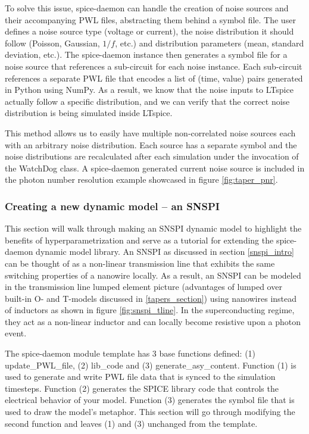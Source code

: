 \documentclass[]{article}
\newcommand{\todo}[2][]{}
\newcommand{\cf}[1]{\textsf{#1}}
\begin{document}
To solve this issue, spice-daemon can handle the creation of noise sources and their accompanying PWL files,
abstracting them behind a symbol file. The user defines a noise source type (voltage or current), the 
noise distribution it should follow (Poisson, Gaussian, $1/f$, etc.) and distribution parameters (mean, 
standard deviation, etc.). The spice-daemon instance then generates a symbol file for a noise source that 
references a sub-circuit for each noise instance. Each sub-circuit references a 
separate PWL file that encodes a list of (time, value) pairs generated in Python using
\cf{NumPy}. As a result, we know that the noise inputs to LTspice actually follow a specific distribution, and we
can verify that the correct noise distribution is being simulated inside LTspice.

This method  allows us to easily have multiple non-correlated noise sources each with an 
arbitrary noise  distribution. Each source has a separate symbol and the noise 
distributions are recalculated after each simulation under the invocation of the \cf{WatchDog}
class. A spice-daemon generated current noise source is included in the photon number resolution 
example showcased in figure \ref{fig:taper_pnr}.

\todo[]{noise example}

\subsubsection{Creating a new dynamic model -- an SNSPI}

This section will walk through making an SNSPI dynamic model to highlight the benefits
of hyperparametrization and serve as a tutorial for extending the spice-daemon dynamic model library. 
An SNSPI as discussed in section \ref{snspi_intro} can be thought
of as a non-linear transmission line that exhibits the same switching properties of a nanowire
locally. As a result, an SNSPI can be modeled in the transmission line lumped element picture
(advantages of lumped over built-in O- and T-models discussed in \ref{tapers_section})
using nanowires instead of inductors as shown in figure
\ref{fig:snspi_tline}. In the superconducting regime, they act as a non-linear
inductor and can locally become resistive upon a photon event.

\begin{sloppypar}
The spice-daemon module template has 3 base functions defined: (1) \cf{update\_PWL\_file},
(2) \cf{lib\_code} and (3) \cf{generate\_asy\_content}. Function (1) is used to generate 
and write PWL file data that is synced to the simulation timesteps. Function (2)
generates the SPICE library code that controls the electrical behavior of your model.
Function (3) generates the symbol file that is used to draw the model's metaphor. This
section will go through modifying the second function and leaves (1) and (3) unchanged
from the template.
\end{sloppypar}
\end{document}
